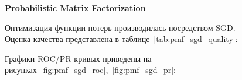 \pagebreak

\textbf{Probabilistic Matrix Factorization}

Оптимизация функции потерь производилась посредством SGD\@.\\
Оценка качества представлена в таблице~\ref{tab:pmf_sgd_quality}:

\begin{table}[h]
    \caption{Значения метрик для PMF}
    \label{tab:pmf_sgd_quality}
\end{table}

Графики ROC/PR-кривых приведены на рисунках~\ref{fig:pmf_sgd_roc},~\ref{fig:pmf_sgd_pr}:

